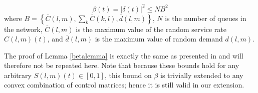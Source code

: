 \begin{Lem} \label{betalemma}
\begin{equation}\label{betabound}
\beta(t)  = \big| \delta(t) \big|^2 \leq NB^2 \end{equation}
where $B = \left\{ \overline{C}(l,m), \sum_{k} \overline{C}(k,l),  \overline{d}(l,m) \right\}$, 
$N$ is the number of queues in the network, $\overline{C} (l,m)$ is the maximum value of the random service rate $C(l,m)(t)$, and $ \overline{d}(l,m)$ is the maximum value of random demand $d(l,m)$.
\end{Lem}
The proof of Lemma \ref{betalemma} is exactly the same as presented in \cite{MaxPressureStochastic} and will therefore not be repeated here. Note that because these bounds hold for any arbitrary $S(l,m)(t) \in [0,1]$, this bound on $\beta$ is trivially extended to any convex combination of control matrices; hence it is still valid in our extension.


